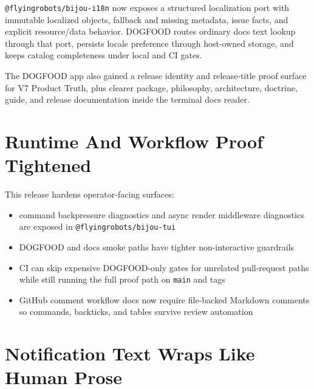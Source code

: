 \texttt{@\allowbreak{}f\allowbreak{}l\allowbreak{}y\allowbreak{}i\allowbreak{}n\allowbreak{}g\allowbreak{}r\allowbreak{}o\allowbreak{}b\allowbreak{}o\allowbreak{}t\allowbreak{}s\allowbreak{}/\allowbreak{}b\allowbreak{}i\allowbreak{}j\allowbreak{}o\allowbreak{}u\allowbreak{}-\allowbreak{}i\allowbreak{}1\allowbreak{}8\allowbreak{}n} now exposes a structured localization port with immutable localized objects, fallback and missing metadata, issue facts, and explicit resource/data behavior. DOGFOOD routes ordinary docs text lookup through that port, persists locale preference through host-owned storage, and keeps catalog completeness under local and CI gates.

The DOGFOOD app also gained a release identity and release-title proof surface for V7 Product Truth, plus clearer package, philosophy, architecture, doctrine, guide, and release documentation inside the terminal docs reader.

\section{Runtime And Workflow Proof Tightened}\label{record-281-runtime-and-workflow-proof-tightened}

This release hardens operator-facing surfaces:

\begin{itemize}
\tightlist
\item
  command backpressure diagnostics and async render middleware diagnostics are exposed in \texttt{@\allowbreak{}f\allowbreak{}l\allowbreak{}y\allowbreak{}i\allowbreak{}n\allowbreak{}g\allowbreak{}r\allowbreak{}o\allowbreak{}b\allowbreak{}o\allowbreak{}t\allowbreak{}s\allowbreak{}/\allowbreak{}b\allowbreak{}i\allowbreak{}j\allowbreak{}o\allowbreak{}u\allowbreak{}-\allowbreak{}t\allowbreak{}u\allowbreak{}i}
\item
  DOGFOOD and docs smoke paths have tighter non-interactive guardrails
\item
  CI can skip expensive DOGFOOD-only gates for unrelated pull-request paths while still running the full proof path on \texttt{m\allowbreak{}a\allowbreak{}i\allowbreak{}n} and tags
\item
  GitHub comment workflow docs now require file-backed Markdown comments so commands, backticks, and tables survive review automation
\end{itemize}

\section{Notification Text Wraps Like Human Prose}\label{record-281-notification-text-wraps-like-human-prose}

